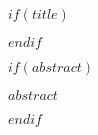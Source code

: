 $if(title)$
\maketitle
$endif$
\thispagestyle{fancy}

$if(abstract)$
\begin{customabstract}
$abstract$
\end{customabstract}
$endif$
